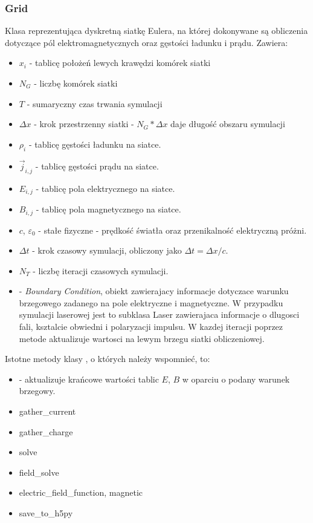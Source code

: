 \subsubsection{Grid}
Klasa reprezentująca dyskretną siatkę Eulera, na której dokonywane są
obliczenia dotyczące pól elektromagnetycznych oraz gęstości ładunku i
prądu.  Zawiera:
\begin{itemize}
    \item $x_i$ - tablicę położeń lewych krawędzi komórek siatki
    \item $N_G$ - liczbę komórek siatki
    \item $T$ - sumaryczny czas trwania symulacji
    \item $\Delta x$ - krok przestrzenny siatki - $N_G * \Delta x$ daje
        długość obszaru symulacji
    \item $\rho_i$ - tablicę gęstości ładunku na siatce.
    \item $\vec{j}_{i,j}$ - tablicę gęstości prądu na siatce.
    \item $E_{i,j}$ - tablicę pola elektrycznego na siatce.
    \item $B_{i,j}$ - tablicę pola magnetycznego na siatce.
    \item $c$, $\varepsilon_0$ - stałe fizyczne - prędkość światła oraz
        przenikalność elektryczną próżni.
    \item $\Delta t$ - krok czasowy symulacji, obliczony jako $\Delta t =
        \Delta x / c$.
    \item $N_T$ - liczbę iteracji czasowych symulacji.
    \item {} - \emph{Boundary Condition}, obiekt zawierajacy informacje dotyczace
        warunku brzegowego zadanego na pole elektryczne i magnetyczne. W przypadku symulacji
        laserowej jest to subklasa Laser zawierajaca informacje o dlugosci fali, ksztalcie obwiedni
        i polaryzacji impulsu. W kazdej iteracji  poprzez metode
         aktualizuje wartosci na lewym brzegu siatki obliczeniowej.            
\end{itemize}

Istotne metody klasy , o których należy wspomnieć, to:
\begin{itemize}
     \item {} - aktualizuje krańcowe wartości tablic $E$, $B$
         w oparciu o podany warunek brzegowy.
     \item gather\_current 
     \item gather\_charge
     \item solve
     \item field\_solve
     \item electric\_field\_function, magnetic
     \item save\_to\_h5py
\end{itemize}

